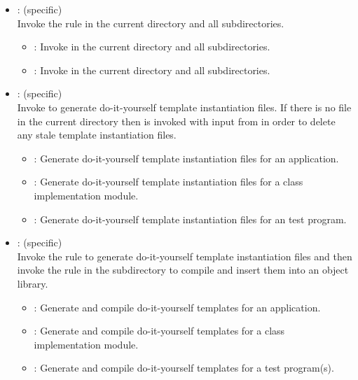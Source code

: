 \begin{itemize}
\item
    : (specific)
   \\ Invoke the  rule in the current directory and all
   subdirectories.
   \begin{itemize}
   \item
      : Invoke  in the current directory and all
      subdirectories.
   \item
      : Invoke  in the current directory and all
      subdirectories.
   \end{itemize}

\item
    : (specific)
   \\ Invoke  to generate do-it-yourself template instantiation
   files.  If there is no  file in the current directory then
    is invoked with input from  in order to delete
   any stale template instantiation files.
   \begin{itemize}
   \item
      : Generate do-it-yourself template instantiation files for an
      application.
   \item
      : Generate do-it-yourself template instantiation files for a
      class implementation module.
   \item
      : Generate do-it-yourself template instantiation files for an
      test program.
   \end{itemize}

\item
    : (specific)
   \\ Invoke the  rule to generate do-it-yourself template
   instantiation files and then invoke the  rule in the
    subdirectory to compile and insert them into an object
   library.
   \begin{itemize}
   \item
      : Generate and compile do-it-yourself templates for an
      application.
   \item
      : Generate and compile do-it-yourself templates for a
      class implementation module.
   \item
      : Generate and compile do-it-yourself templates for a
      test program(s).
   \end{itemize}


\end{itemize}
